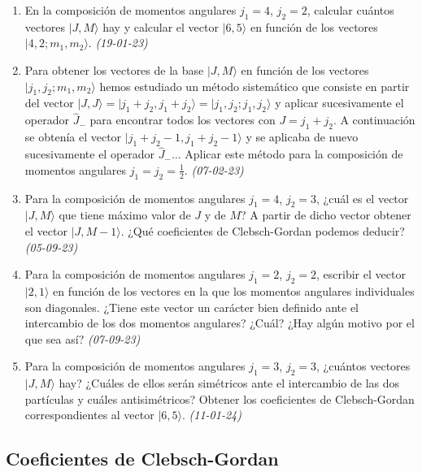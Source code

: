 \begin{enumerate}
    \item En la composición de momentos angulares $j_1 = 4$, $j_2 = 2$, calcular cuántos vectores $|J, M \rangle$ hay y calcular el vector $|6, 5\rangle$ en función de los vectores $|4, 2; m_1, m_2 \rangle$. \textit{(19-01-23)}
    
    \item Para obtener los vectores de la base $|J, M \rangle$ en función de los vectores $|j_1, j_2; m_1, m_2 \rangle$ hemos estudiado un método sistemático que consiste en partir del vector $|J, J \rangle = |j_1 + j_2, j_1 + j_2 \rangle = |j_1, j_2; j_1, j_2 \rangle$ y aplicar sucesivamente el operador $\hat{J}_-$ para encontrar todos los vectores con $J = j_1 + j_2$. A continuación se obtenía el vector $|j_1 + j_2 - 1, j_1 + j_2 - 1 \rangle$ y se aplicaba de nuevo sucesivamente el operador $\hat{J}_- \ldots$ Aplicar este método para la composición de momentos angulares $j_1 = j_2 = \frac{1}{2}$. \textit{(07-02-23)}

    \item Para la composición de momentos angulares $j_1 = 4$, $j_2 = 3$, ¿cuál es el vector $|J, M \rangle$ que tiene máximo valor de $J$ y de $M$? A partir de dicho vector obtener el vector $|J, M - 1\rangle$. ¿Qué coeficientes de Clebsch-Gordan podemos deducir? \textit{(05-09-23)}

    \item Para la composición de momentos angulares $j_1 = 2$, $j_2 = 2$, escribir el vector $|2, 1\rangle$ en función de los vectores en la que los momentos angulares individuales son diagonales. ¿Tiene este vector un carácter bien definido ante el intercambio de los dos momentos angulares? ¿Cuál? ¿Hay algún motivo por el que sea así? \textit{(07-09-23)}

    \item Para la composición de momentos angulares $j_1 = 3$, $j_2 = 3$, ¿cuántos vectores $|J, M \rangle$ hay? ¿Cuáles de ellos serán simétricos ante el intercambio de las dos partículas y cuáles antisimétricos? Obtener los coeficientes de Clebsch-Gordan correspondientes al vector $|6, 5 \rangle$. \textit{(11-01-24)}


\end{enumerate}

\subsection*{Coeficientes de Clebsch-Gordan}

